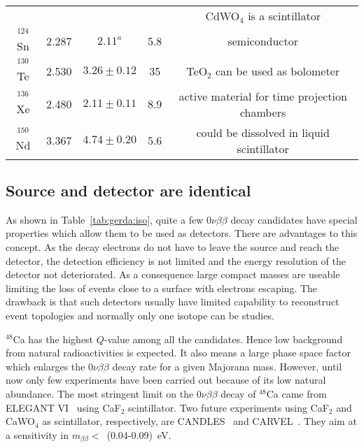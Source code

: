 \begin{table}[htbp]
\begin{minipage}{\linewidth}
\begin{tabular}{ccccc}
      & & & & CdWO$_{4}$ is a scintillator\\
      $^{124}$Sn & 2.287 & $2.11^{a}$ & 5.8 & semiconductor \\
      $^{130}$Te & 2.530 & $3.26 \pm 0.12$ & 35 & TeO$_{2}$ can be       used as bolometer\\
      $^{136}$Xe & 2.480 & $2.11 \pm 0.11$ & 8.9 & active material for       time projection chambers\\
      $^{150}$Nd & 3.367 & $4.74 \pm 0.20$ & 5.6 & could be dissolved       in liquid scintillator\\
    \end{tabular}
  \end{minipage}
\end{table}

\subsection{Source and detector are identical}
\label{sec:exp:sed}
As shown in Table~\ref{tab:gerda:iso}, quite a few $0\nu\beta\beta$ decay candidates have special properties which allow them to be used as detectors. There are advantages to this concept. As the decay electrons do not have to leave the source and reach the detector, the detection efficiency is not limited and the energy resolution of the detector not deteriorated. As a consequence large compact masses are useable limiting the loss of events close to a surface with electrons escaping. The drawback is that such detectors usually have limited capability to reconstruct event topologies and normally only one isotope can be studies.

$^{48}$Ca has the highest $Q$-value among all the candidates. Hence low background from natural radioactivities is expected. It also means a large phase space factor which enlarges the $0\nu\beta\beta$ decay rate for a given Majorana mass. However, until now only few experiments have been carried out because of its low natural abundance. The most stringent limit on the $0\nu\beta\beta$ decay of $^{48}$Ca came from ELEGANT VI~\cite{Oga04} using CaF$_{2}$ scintillator. Two future experiments using CaF$_{2}$ and CaWO$_{4}$ as scintillator, respectively, are CANDLES~\cite{Hir08} and CARVEL~\cite{Zde05}. They aim at a sensitivity in $m_{\beta\beta} <$~(0.04-0.09)~eV.

